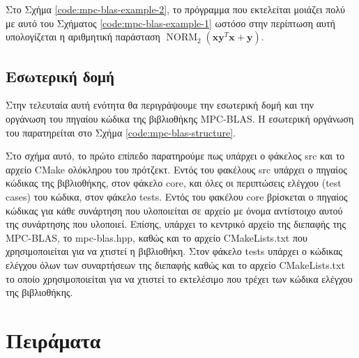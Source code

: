 Στο Σχήμα \ref{code:mpc-blas-example-2}, το πρόγραμμα που εκτελείται μοιάζει πολύ με αυτό του Σχήματος \ref{code:mpc-blas-example-1} ωστόσο στην περίπτωση αυτή υπολογίζεται η αριθμητική παράσταση $\operatorname{NORM}_2(\textbf{x}\textbf{y}^{T}\textbf{x} + \textbf{y})$.


\subsection{Εσωτερική δομή}

Στην τελευταία αυτή ενότητα θα περιγράψουμε την εσωτερική δομή και την οργάνωση του πηγαίου κώδικα της βιβλιοθήκης MPC-BLAS. Η εσωτερική οργάνωση του παρατηρείται στο Σχήμα \ref{code:mpc-blas-structure}.


Στο σχήμα αυτό, το πρώτο επίπεδο παρατηρούμε πως υπάρχει ο φάκελος src και το αρχείο CMake ολόκληρου του πρότζεκτ. Εντός του φακέλους src υπάρχει ο πηγαίος κώδικας της βιβλιοθήκης, στον φάκελο core, και όλες οι περιπτώσεις ελέγχου (test cases) του κώδικα, στον φάκελο tests. Εντός του φακέλου core βρίσκεται ο πηγαίος κώδικας για κάθε συνάρτηση που υλοποιείται σε αρχείο με όνομα αντίστοιχο αυτού της συνάρτησης που υλοποιεί. Επίσης, υπάρχει το κεντρικό αρχείο της διεπαφής της MPC-BLAS, το mpc-blas.hpp, καθώς και το αρχείο CMakeLists.txt που χρησιμοποιείται για να χτιστεί η βιβλιοθήκη. Στον φάκελο tests υπάρχει ο κώδικας ελέγχου όλων των συναρτήσεων της διεπαφής καθώς και το αρχείο CMakeLists.txt το οποίο χρησιμοποιείται για να χτιστεί το εκτελέσιμο που τρέχει των κώδικα ελέγχου της βιβλιοθήκης.

\section{Πειράματα}

